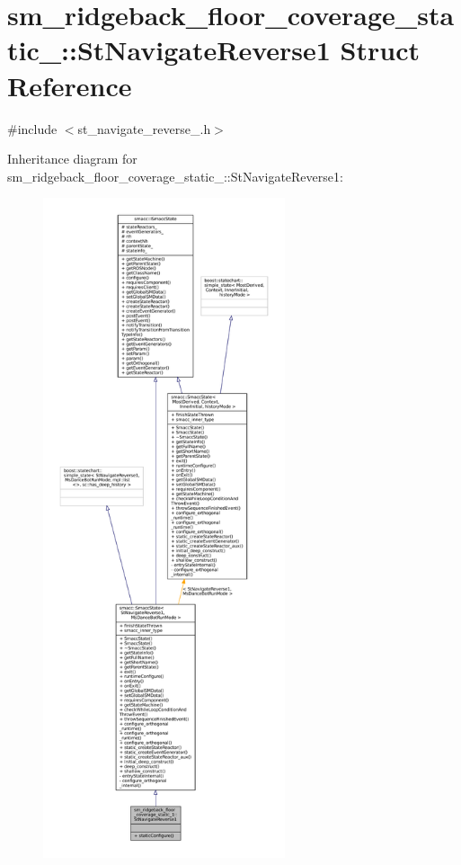 \hypertarget{structsm__ridgeback__floor__coverage__static__1_1_1StNavigateReverse1}{}\section{sm\+\_\+ridgeback\+\_\+floor\+\_\+coverage\+\_\+static\+\_\+:\+:St\+Navigate\+Reverse1 Struct Reference}
\label{structsm__ridgeback__floor__coverage__static__1_1_1StNavigateReverse1}


{\ttfamily \#include $<$st\+\_\+navigate\+\_\+reverse\+\_.\+h$>$}



Inheritance diagram for sm\+\_\+ridgeback\+\_\+floor\+\_\+coverage\+\_\+static\+\_\+:\+:St\+Navigate\+Reverse1\+:
\nopagebreak
\begin{figure}[H]
\begin{center}
\leavevmode
\includegraphics[height=550pt]{structsm__ridgeback__floor__coverage__static__1_1_1StNavigateReverse1__inherit__graph}
\end{center}
\end{figure}


